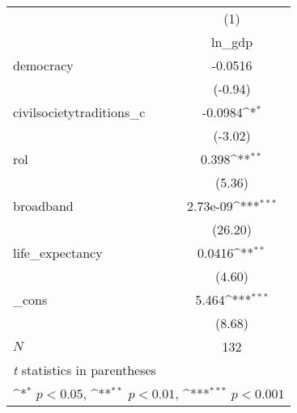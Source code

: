 {
\def\sym#1{\ifmmode^{#1}\else\(^{#1}\)\fi}
\begin{tabular}{l*{1}{c}}
\hline\hline
            &\multicolumn{1}{c}{(1)}\\
            &\multicolumn{1}{c}{ln\_gdp}\\
\hline
democracy   &     -0.0516         \\
            &     (-0.94)         \\
[1em]
civilsocietytraditions\_c&     -0.0984\sym{*}  \\
            &     (-3.02)         \\
[1em]
rol         &       0.398\sym{**} \\
            &      (5.36)         \\
[1em]
broadband   &    2.73e-09\sym{***}\\
            &     (26.20)         \\
[1em]
life\_expectancy&      0.0416\sym{**} \\
            &      (4.60)         \\
[1em]
\_cons      &       5.464\sym{***}\\
            &      (8.68)         \\
\hline
\(N\)       &         132         \\
\hline\hline
\multicolumn{2}{l}{\footnotesize \textit{t} statistics in parentheses}\\
\multicolumn{2}{l}{\footnotesize \sym{*} \(p<0.05\), \sym{**} \(p<0.01\), \sym{***} \(p<0.001\)}\\
\end{tabular}
}
